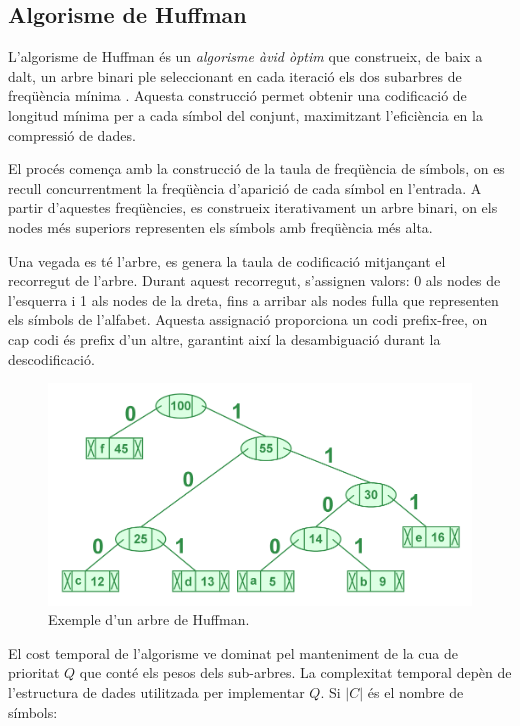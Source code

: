 \documentclass{ieeetj}
\begin{document}
\subsection{Algorisme de Huffman} 

L’algorisme de Huffman és un \emph{algorisme àvid òptim} que construeix, de baix a dalt, un arbre binari ple seleccionant en cada iteració els dos subarbres de freqüència mínima \cite{huffman1952}. Aquesta construcció permet obtenir una codificació de longitud mínima per a cada símbol del conjunt, maximitzant l'eficiència en la compressió de dades.\newline

El procés comença amb la construcció de la taula de freqüència de símbols, on es recull concurrentment la freqüència d’aparició de cada símbol en l’entrada. A partir d’aquestes freqüències, es construeix iterativament un arbre binari, on els nodes més superiors representen els símbols amb freqüència més alta. \newline

Una vegada es té l'arbre, es genera la taula de codificació mitjançant el recorregut de l'arbre. Durant aquest recorregut, s’assignen valors: 0 als nodes de l’esquerra i 1 als nodes de la dreta, fins a arribar als nodes fulla que representen els símbols de l’alfabet. Aquesta assignació proporciona un codi prefix-free, on cap codi és prefix d’un altre, garantint així la desambiguació durant la descodificació.

\begin{figure}[h]
    \centering
\includegraphics[width=\linewidth]{png/huffman.png}
    \caption{Exemple d'un arbre de Huffman.}
    \label{fig:enter-label}
\end{figure}


El cost temporal de l'algorisme ve dominat pel manteniment de la cua de prioritat $Q$ que conté els pesos dels sub-arbres. La complexitat temporal depèn de l'estructura de dades utilitzada per implementar $Q$. \newline
Si $|C|$ és el nombre de símbols:
\end{document}
